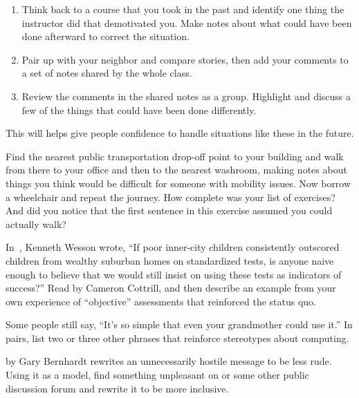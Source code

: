 \begin{enumerate}
\item
  Think back to a course that you took in the past
  and identify one thing the instructor did that demotivated you.
  Make notes about what could have been done afterward to correct the situation.
\item
  Pair up with your neighbor and compare stories,
  then add your comments to a set of notes shared by the whole class.
\item
  Review the comments in the shared notes as a group.
  Highlight and discuss a few of the things that could have been done differently.
\end{enumerate}

This will helps give people confidence to handle situations like these in the future.


Find the nearest public transportation drop-off point to your building
and walk from there to your office and then to the nearest washroom,
making notes about things you think would be difficult for someone with mobility issues.
Now borrow a wheelchair and repeat the journey.
How complete was your list of exercises?
And did you notice that the first sentence in this exercise assumed you could actually walk?


In~\cite{Litt2004},
Kenneth Wesson wrote,
``If poor inner-city children consistently outscored children from wealthy suburban homes on standardized tests,
is anyone naive enough to believe that we would still insist on using these tests as indicators of success?''
Read 
by Cameron Cottrill,
and then describe an example from your own experience of ``objective'' assessments that reinforced the status quo.


Some people still say, ``It's so simple that even your grandmother could use it.''
In pairs,
list two or three other phrases that reinforce stereotypes about computing.


by Gary Bernhardt
rewrites an unnecessarily hostile message to be less rude.
Using it as a model,
find something unpleasant on  or some other public discussion forum
and rewrite it to be more inclusive.

